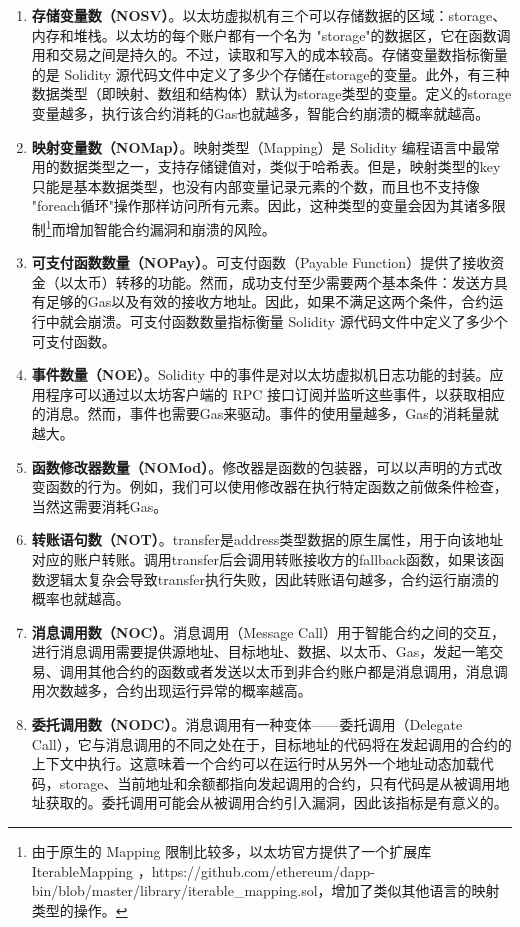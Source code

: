 \begin{enumerate}[label=\Alph*., align=left, leftmargin=*]
    \item \textbf{存储变量数（NOSV）}。以太坊虚拟机有三个可以存储数据的区域：storage、内存和堆栈。以太坊的每个账户都有一个名为 "storage"的数据区，它在函数调用和交易之间是持久的。不过，读取和写入的成本较高。存储变量数指标衡量的是 Solidity 源代码文件中定义了多少个存储在storage的变量。此外，有三种数据类型（即映射、数组和结构体）默认为storage类型的变量。定义的storage变量越多，执行该合约消耗的Gas也就越多，智能合约崩溃的概率就越高。
    \item \textbf{映射变量数（NOMap）}。映射类型（Mapping）是 Solidity 编程语言中最常用的数据类型之一，支持存储键值对，类似于哈希表。但是，映射类型的key只能是基本数据类型，也没有内部变量记录元素的个数，而且也不支持像 "foreach循环"操作那样访问所有元素。因此，这种类型的变量会因为其诸多限制\footnote{由于原生的 Mapping 限制比较多，以太坊官方提供了一个扩展库 IterableMapping ，https://github.com/ethereum/dapp-bin/blob/master/library/iterable\_mapping.sol，增加了类似其他语言的映射类型的操作。}而增加智能合约漏洞和崩溃的风险。
    \item \textbf{可支付函数数量（NOPay）}。可支付函数（Payable Function）提供了接收资金（以太币）转移的功能。然而，成功支付至少需要两个基本条件：发送方具有足够的Gas以及有效的接收方地址。因此，如果不满足这两个条件，合约运行中就会崩溃。可支付函数数量指标衡量 Solidity 源代码文件中定义了多少个可支付函数。
    \item \textbf{事件数量（NOE）}。Solidity 中的事件是对以太坊虚拟机日志功能的封装。应用程序可以通过以太坊客户端的 RPC 接口订阅并监听这些事件，以获取相应的消息。然而，事件也需要Gas来驱动。事件的使用量越多，Gas的消耗量就越大。
    \item \textbf{函数修改器数量（NOMod）}。修改器是函数的包装器，可以以声明的方式改变函数的行为。例如，我们可以使用修改器在执行特定函数之前做条件检查，当然这需要消耗Gas。
    \item \textbf{转账语句数（NOT）}。transfer是address类型数据的原生属性，用于向该地址对应的账户转账。调用transfer后会调用转账接收方的fallback函数，如果该函数逻辑太复杂会导致transfer执行失败，因此转账语句越多，合约运行崩溃的概率也就越高。
    \item \textbf{消息调用数（NOC）}。消息调用（Message Call）用于智能合约之间的交互，进行消息调用需要提供源地址、目标地址、数据、以太币、Gas，发起一笔交易、调用其他合约的函数或者发送以太币到非合约账户都是消息调用，消息调用次数越多，合约出现运行异常的概率越高。
    \item \textbf{委托调用数（NODC）}。消息调用有一种变体——委托调用（Delegate Call），它与消息调用的不同之处在于，目标地址的代码将在发起调用的合约的上下文中执行。这意味着一个合约可以在运行时从另外一个地址动态加载代码，storage、当前地址和余额都指向发起调用的合约，只有代码是从被调用地址获取的。委托调用可能会从被调用合约引入漏洞，因此该指标是有意义的。

\end{enumerate}
